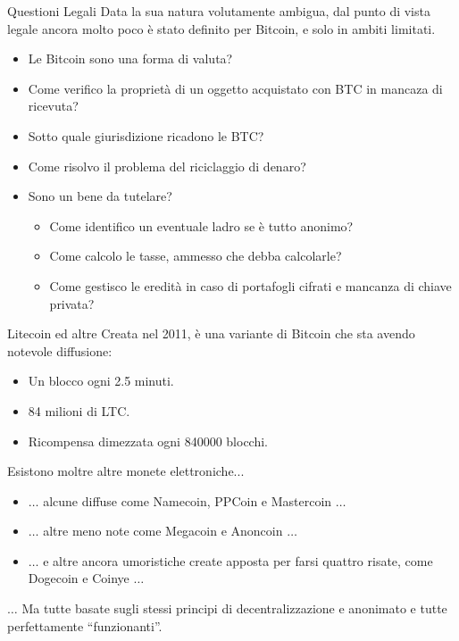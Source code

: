 \documentclass[italian]{beamer}
\begin{document}
\begin{frame}{Questioni Legali}
  Data la sua natura volutamente ambigua, dal punto di vista legale ancora molto poco è stato definito per Bitcoin, e solo in ambiti limitati.\pause
  \begin{itemize}
   \item Le Bitcoin sono una forma di valuta? \pause
   \item Come verifico la proprietà di un oggetto acquistato con BTC in mancaza di ricevuta?\pause
   \item Sotto quale giurisdizione ricadono le BTC? \pause
   \item Come risolvo il problema del riciclaggio di denaro? \pause
   \item Sono un bene da tutelare?\pause
   \begin{itemize}
    \item Come identifico un eventuale ladro se è tutto anonimo? \pause
    \item Come calcolo le tasse, ammesso che debba calcolarle? \pause
    \item Come gestisco le eredità in caso di portafogli cifrati e mancanza di chiave privata?
   \end{itemize}
  \end{itemize}
\end{frame}

\begin{frame}{Litecoin ed altre}
  Creata nel 2011, è una variante di Bitcoin che sta avendo notevole diffusione:
  \begin{itemize}
   \item Un blocco ogni 2.5 minuti.
   \item 84 milioni di LTC.
   \item Ricompensa dimezzata ogni 840000 blocchi.
  \end{itemize}
  Esistono moltre altre monete elettroniche... \pause
  \begin{itemize}
    \item $\ldots$ alcune diffuse come Namecoin, PPCoin e Mastercoin $\ldots$ \pause
    \item $\ldots$ altre meno note come Megacoin e Anoncoin $\ldots$ \pause
    \item $\ldots$ e altre ancora umoristiche create apposta per farsi quattro risate, come Dogecoin e Coinye $\ldots$ \pause
  \end{itemize}
  $\ldots$ Ma tutte basate sugli stessi principi di decentralizzazione e anonimato e tutte perfettamente ``funzionanti''.
\end{frame}
\end{document}
